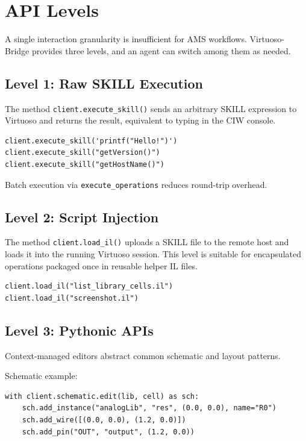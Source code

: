 \documentclass[lettersize,journal]{ieee_template/IEEEtran}
\begin{document}
\section{API Levels}

A single interaction granularity is insufficient for AMS workflows. Virtuoso-Bridge provides three levels, and an agent can switch among them as needed.

\subsection{Level 1: Raw SKILL Execution}
The method \texttt{client.execute\_skill()} sends an arbitrary SKILL expression to Virtuoso and returns the result, equivalent to typing in the CIW console.

\begin{lstlisting}
client.execute_skill('printf("Hello!")')
client.execute_skill("getVersion()")
client.execute_skill("getHostName()")
\end{lstlisting}

Batch execution via \texttt{execute\_operations} reduces round-trip overhead.

\subsection{Level 2: Script Injection}
The method \texttt{client.load\_il()} uploads a SKILL file to the remote host and loads it into the running Virtuoso session. This level is suitable for encapsulated operations packaged once in reusable helper IL files.

\begin{lstlisting}
client.load_il("list_library_cells.il")
client.load_il("screenshot.il")
\end{lstlisting}

\subsection{Level 3: Pythonic APIs}
Context-managed editors abstract common schematic and layout patterns.

Schematic example:

\begin{lstlisting}
with client.schematic.edit(lib, cell) as sch:
    sch.add_instance("analogLib", "res", (0.0, 0.0), name="R0")
    sch.add_wire([(0.0, 0.0), (1.2, 0.0)])
    sch.add_pin("OUT", "output", (1.2, 0.0))
\end{lstlisting}
\end{document}

